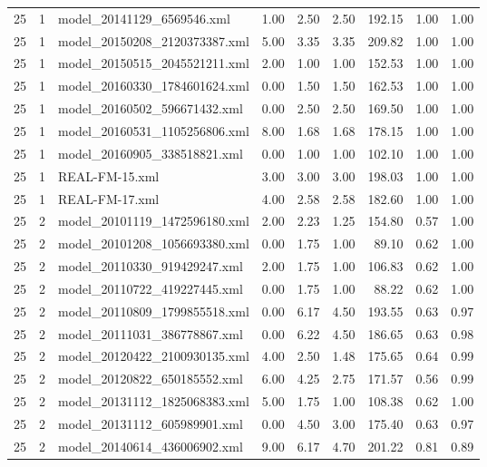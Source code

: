 \begin{table}[ht]
\begin{tabular}{rrlrrrrrr}
   25 &   1 & model\_20141129\_6569546.xml & 1.00 & 2.50 & 2.50 & 192.15 & 1.00 & 1.00 \\ 
   25 &   1 & model\_20150208\_2120373387.xml & 5.00 & 3.35 & 3.35 & 209.82 & 1.00 & 1.00 \\ 
   25 &   1 & model\_20150515\_2045521211.xml & 2.00 & 1.00 & 1.00 & 152.53 & 1.00 & 1.00 \\ 
   25 &   1 & model\_20160330\_1784601624.xml & 0.00 & 1.50 & 1.50 & 162.53 & 1.00 & 1.00 \\ 
   25 &   1 & model\_20160502\_596671432.xml & 0.00 & 2.50 & 2.50 & 169.50 & 1.00 & 1.00 \\ 
   25 &   1 & model\_20160531\_1105256806.xml & 8.00 & 1.68 & 1.68 & 178.15 & 1.00 & 1.00 \\ 
   25 &   1 & model\_20160905\_338518821.xml & 0.00 & 1.00 & 1.00 & 102.10 & 1.00 & 1.00 \\ 
   25 &   1 & REAL-FM-15.xml & 3.00 & 3.00 & 3.00 & 198.03 & 1.00 & 1.00 \\ 
   25 &   1 & REAL-FM-17.xml & 4.00 & 2.58 & 2.58 & 182.60 & 1.00 & 1.00 \\ 
   25 &   2 & model\_20101119\_1472596180.xml & 2.00 & 2.23 & 1.25 & 154.80 & 0.57 & 1.00 \\ 
   25 &   2 & model\_20101208\_1056693380.xml & 0.00 & 1.75 & 1.00 & 89.10 & 0.62 & 1.00 \\ 
   25 &   2 & model\_20110330\_919429247.xml & 2.00 & 1.75 & 1.00 & 106.83 & 0.62 & 1.00 \\ 
   25 &   2 & model\_20110722\_419227445.xml & 0.00 & 1.75 & 1.00 & 88.22 & 0.62 & 1.00 \\ 
   25 &   2 & model\_20110809\_1799855518.xml & 0.00 & 6.17 & 4.50 & 193.55 & 0.63 & 0.97 \\ 
   25 &   2 & model\_20111031\_386778867.xml & 0.00 & 6.22 & 4.50 & 186.65 & 0.63 & 0.98 \\ 
   25 &   2 & model\_20120422\_2100930135.xml & 4.00 & 2.50 & 1.48 & 175.65 & 0.64 & 0.99 \\ 
   25 &   2 & model\_20120822\_650185552.xml & 6.00 & 4.25 & 2.75 & 171.57 & 0.56 & 0.99 \\ 
   25 &   2 & model\_20131112\_1825068383.xml & 5.00 & 1.75 & 1.00 & 108.38 & 0.62 & 1.00 \\ 
   25 &   2 & model\_20131112\_605989901.xml & 0.00 & 4.50 & 3.00 & 175.40 & 0.63 & 0.97 \\ 
   25 &   2 & model\_20140614\_436006902.xml & 9.00 & 6.17 & 4.70 & 201.22 & 0.81 & 0.89 \\ 

\end{tabular}
\end{table}
